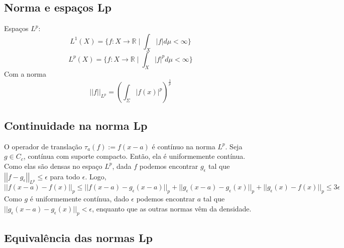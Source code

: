 \documentclass[11pt]{article}
\newcommand{\R}{\mathbb{R}}
\newcommand{\e}{\epsilon}
\newcommand{\norm}[2]{\left|\left|#1\right|\right|_{L^{#2}}}
\newcommand{\nor}[2]{||#1||_{#2}}
\begin{document}
\subsection{Norma e espaços Lp}

Espaços \( L^p: \)
\[ L^1(X) = \{ f:X\rightarrow\R \mid \int_X |f| d\mu < \infty \} \]
\[ L^p(X) = \{ f:X\rightarrow\R \mid \int_X |f|^p d\mu < \infty \} \]
Com a norma \[ \norm{f}{p} = \left(\int_\Sigma | f(x) |^p\right) ^{\frac{1}{p}}\]


\subsection{Continuidade na norma Lp}

O operador de translação \(\tau_a(f) := f(x-a)\) é contínuo na norma \(L^p\). Seja \(g \in C_c\), contínua com suporte compacto. Então, ela é uniformemente contínua. Como elas são densas no espaço \(L^p\), dada \(f\) podemos encontrar \(g_\e\) tal que \(\norm{f - g_\e}{p} \leq \e\) para todo \(\e\). Logo,
\[\nor{f(x-a) - f(x)}{p} \leq \nor{f(x-a) - g_\e(x-a)}{p} + \nor{g_\e(x-a) - g_\e(x)}{p} + \nor{g_\e(x) - f(x)}{p} \leq 3\e\]
Como \(g\) é uniformemente contínua, dado \(\e\) podemos encontrar \(a\) tal que \(\nor{g_\e(x-a) - g_\e(x)}{p} < \e\), enquanto que as outras normas vêm da densidade.

\subsection{Equivalência das normas Lp}\label{subsec:lp-equivalencia}

\begin{center}
\end{center}
\end{document}
